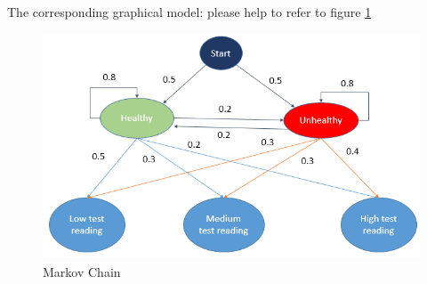 \documentclass[paper=a4, fontsize=11pt]{scrartcl} %
\numberwithin{equation}{section} %
\numberwithin{figure}{section} %
\numberwithin{table}{section} %
\begin{document}
The corresponding graphical model: please help to refer to figure \ref{fig:markov}
\begin{figure}[H]
 	\centering
 	\includegraphics[scale=0.5]{./markov.png}
 	\caption{Markov Chain}
 	\label{fig:markov}
 \end{figure}
\end{document}
